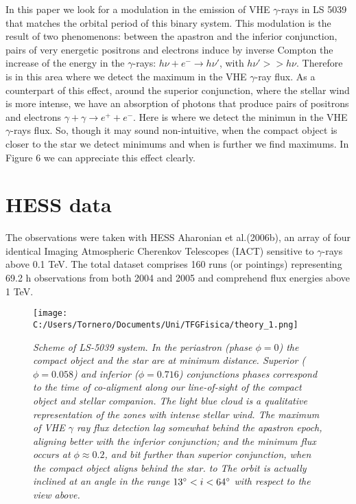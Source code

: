 \documentclass[twocolumn]{revtex4}
\begin{document}
In this paper we look for a modulation in the emission of VHE $\gamma$-rays in LS 5039 that matches the orbital period of this binary system. This modulation is the result of two phenomenons: between the apastron and the inferior conjunction, pairs of very energetic positrons and electrons induce by inverse Compton the increase of the energy in the $\gamma$-rays: $h \nu + e^- \rightarrow h \nu'$, with $h \nu' >> h \nu.$ Therefore is in this area where we detect the maximum in the VHE $\gamma$-ray flux. As a counterpart of this effect, around the superior conjunction, where the stellar wind is more intense, we have an absorption of photons that produce pairs of positrons and electrons $\gamma + \gamma \rightarrow e^+ + e^-$. Here is where we detect the minimun in the VHE $\gamma$-rays flux. So, though it may sound non-intuitive, when the compact object is closer to the star we detect minimums and when is further we find maximums. In Figure 6 we can appreciate this effect clearly. 

\section{HESS data} 

The observations were taken with HESS Aharonian et al.(2006b), an array of four identical Imaging Atmospheric Cherenkov Telescopes (IACT)  sensitive to $\gamma$-rays above 0.1 TeV. The total dataset comprises 160 runs (or pointings) representing 69.2 h observations from both 2004 and 2005 and comprehend flux energies above 1 TeV.

\begin{figure}[t]
\centering
\texttt{[image: C:/Users/Tornero/Documents/Uni/TFGFisica/theory\_1.png]}
\caption{\textit{Scheme of LS-5039 system. In the periastron (phase $\phi = 0$) the compact object and the star are at minimum distance. Superior ($\phi = 0.058$) and inferior ($\phi = 0.716$) conjunctions phases correspond to the time of co-aligment along our line-of-sight of the compact object and stellar companion. The light blue cloud is a qualitative representation of the zones with intense stellar wind. The maximum of VHE $\gamma$ ray flux detection lag somewhat behind the apastron epoch, aligning better with the inferior conjunction; and the minimum flux occurs at $\phi \approx 0.2$, and bit further than superior conjunction, when the compact object aligns behind the star. to The orbit is actually inclined at an angle in the range $13 \degree < i <64 \degree$ with respect to the view above.}}
\label{fig:sample}
\end{figure}
\end{document}
